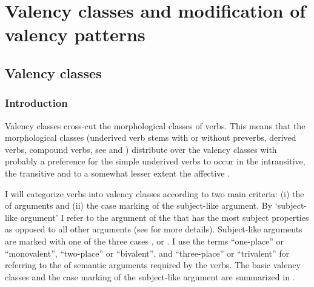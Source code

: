 \chapter{Valency classes and modification of valency patterns}
\label{cpt:Verb valency classes}


\section{Valency classes}
\label{sec:Verb valency classes}

\subsection{Introduction}
\label{sec:valencyclassesintro}

Valency classes cross-cut the morphological classes of verbs. This means that the morphological classes (underived verb stems with or without preverbs, derived verbs, compound verbs, see   and ) distribute over the valency classes with probably a preference for the simple underived verbs to occur in the intransitive, the transitive and to a somewhat lesser extent the affective .

I will categorize verbs into valency classes according to two main criteria: (i) the  of arguments and (ii) the case marking of the subject-like argument. By `subject-like argument' I refer to the argument of the  that has the most subject properties as opposed to all other arguments (see  for more details). Subject-like arguments are marked with one of the three cases ,  or . I use the terms ``one-place'' or ``monovalent'', ``two-place'' or ``bivalent'', and ``three-place'' or ``trivalent'' for referring to the  of semantic arguments required by the verbs. The basic valency classes and the case marking of the subject-like argument are summarized in .\largerpage



